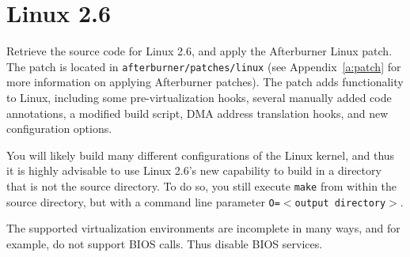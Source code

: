\documentclass[twoside,a4paper]{report}
\newcommand{\code}[1]{{\tt #1}}
\begin{document}
\section{Linux 2.6}

Retrieve the source code for Linux 2.6, and apply the Afterburner
Linux patch.  The patch is located in \code{afterburner/patches/linux}
(see Appendix~\ref{a:patch} for more information on applying
Afterburner patches).  The patch adds functionality to Linux,
including some pre-virtualization hooks, several manually added code
annotations, a modified build script, DMA address translation hooks,
and new configuration options.

You will likely build many different configurations of the Linux
kernel, and thus it is highly advisable to use Linux 2.6's new
capability to build in a directory that is not the source directory.
To do so, you still execute \code{make} from within the source
directory, but with a command line parameter \code{O=$<$output
directory$>$}.

The supported virtualization environments are incomplete in many ways,
and for example, do not support BIOS calls.  Thus disable BIOS
services.
\end{document}
